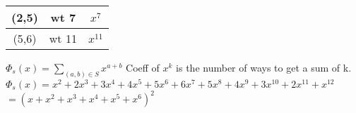 \documentclass[12pt]{article}
\begin{document}
	\begin{tabular}{c | c | c}
		(2,5) & wt 7 & $x^7$ \\ \hline
		(5,6) & wt 11 & $x^{11}$ \\ \hline
	\end{tabular}
	
	$\Phi_s(x) = \sum_{(a,b) \in S}x^{a+b}$ Coeff of $x^k$ is the number of ways to get a sum of k.\\
	
	$\Phi_s(x) = x^2 + 2x^3 + 3x^4 + 4x^5 + 5x^6 + 6x^7 + 5x^8 + 4x^9 + 3x^10 + 2x^11 + x^12$\\
	$ = (x + x^2 + x^3 + x^4 + x^5 + x^6)^2$\\
	
	
	
	
	
\end{document}
